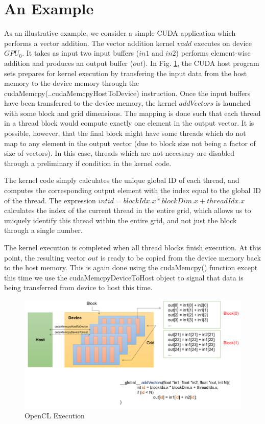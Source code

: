\section{An Example}

	\par As an illustrative example, we consider a simple CUDA application which performs a vector addition. The vector addition kernel $vadd$ executes on device $GPU_0$. It takes as input two input buffers ($in1$ and $in2$) performs element-wise addition and produces an output buffer ($out$). In Fig. \ref{fig:OpenCLArch}, the CUDA host program sets prepares for kernel execution by transfering the input data from the host memory to the device memory through the cudaMemcpy(..cudaMemcpyHostToDevice) instruction. Once the input buffers have been transferred to the device memory, the kernel $addVectors$ is launched with some block and grid dimensions. The mapping is done such that each thread in a thread block would compute exactly one element in the output vector. It is possible, however, that the final block might have some threads which do not map to any element in the output vector (due to block size not being a factor of size of vectors). In this case, threads which are not necessary are disabled through a preliminary if condition in the kernel code.
	
	The kernel code simply calculates the unique global ID of each thread, and computes the corresponding output element with the index equal to the global ID of the thread. The expression $int id = blockIdx.x * blockDim.x + threadIdx.x$ calculates the index of the current thread in the entire grid, which allows us to uniquely identify this thread within the entire grid, and not just the block through a single number.
	
	The kernel execution is completed when all thread blocks finish execution. At this point, the resulting vector $out$ is ready to be copied from the device memory back to the host memory. This is again done using the cudaMemcpy() function except this time we use the cudaMemcpyDeviceToHost object to signal that data is being transferred from device to host this time.
	
	\begin{figure}[ht]  
		\centering
		\includegraphics[scale=0.25]{Pictures/ch2/add_example.png}
		\caption{OpenCL Execution \label{fig:OpenCLArch}}
	\end{figure}
	

